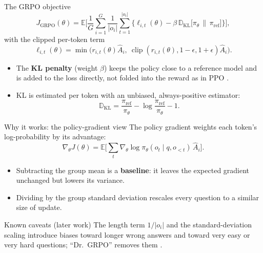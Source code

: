 \documentclass[xcolor=svgnames]{beamer}
\begin{document}
\begin{frame}{The GRPO objective}
\[
J_{\text{GRPO}}(\theta)=\mathbb{E}\Bigg[\frac{1}{G}\sum_{i=1}^{G}\frac{1}{|o_i|}\sum_{t=1}^{|o_i|}
\Big\{\ell_{i,t}(\theta)-\beta\,\mathbb{D}_{\text{KL}}\big[\pi_\theta \,\|\, \pi_{\text{ref}}\big]\Big\}\Bigg],
\]
with the clipped per-token term
\[
\ell_{i,t}(\theta)=\min\big(r_{i,t}(\theta)\hat{A}_{i},\ \operatorname{clip}(r_{i,t}(\theta),1-\epsilon,1+\epsilon)\hat{A}_{i}\big).
\]
\begin{itemize}
  \item The \textbf{KL penalty} (weight $\beta$) keeps the policy close to a reference model and is added to the loss directly, not folded into the reward as in PPO \cite{shao2024deepseekmath}.
  \item KL is estimated per token with an unbiased, always-positive estimator:
  \[
  \mathbb{D}_{\text{KL}} = \frac{\pi_{\text{ref}}}{\pi_\theta} - \log\frac{\pi_{\text{ref}}}{\pi_\theta} - 1 .
  \]
\end{itemize}
\end{frame}

\begin{frame}{Why it works: the policy-gradient view}
The policy gradient weights each token's log-probability by its advantage:
\[
\nabla_\theta J(\theta)=\mathbb{E}\Big[\sum_{t}\nabla_\theta \log \pi_\theta(o_t \mid q,o_{<t})\, \hat{A}_{i}\Big].
\]
\begin{itemize}
  \item Subtracting the group mean is a \textbf{baseline}: it leaves the expected gradient unchanged but lowers its variance.
  \item Dividing by the group standard deviation rescales every question to a similar size of update.
\end{itemize}
\begin{alertblock}{Known caveats (later work)}
The length term $1/|o_i|$ and the standard-deviation scaling introduce biases toward longer wrong answers and toward very easy or very hard questions; ``Dr.~GRPO'' removes them \cite{liu2025drgrpo}.
\end{alertblock}
\end{frame}

\end{document}
